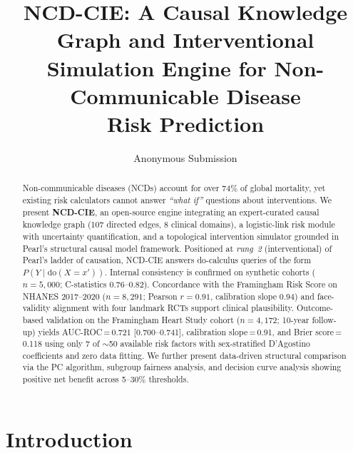 \documentclass[runningheads]{llncs}
\begin{document}
\title{NCD-CIE: A Causal Knowledge Graph and Interventional\\Simulation Engine for Non-Communicable Disease\\Risk Prediction}

\author{Anonymous Submission}

\maketitle

\begin{abstract}
Non-communicable diseases (NCDs) account for over 74\% of global
mortality, yet existing risk calculators cannot answer \emph{``what
if''} questions about interventions.  We present \textbf{NCD-CIE}, an
open-source engine integrating an expert-curated causal knowledge
graph (107 directed edges, 8 clinical domains), a logistic-link risk
module with uncertainty quantification, and a topological intervention
simulator grounded in Pearl's structural causal model framework.
Positioned at \emph{rung~2} (interventional) of Pearl's ladder of
causation, NCD-CIE answers do-calculus queries of the form
$P(Y \mid \mathrm{do}(X\!=\!x'))$.  Internal consistency is confirmed
on synthetic cohorts ($n\!=\!5{,}000$; C-statistics 0.76--0.82).
Concordance with the Framingham Risk Score on NHANES 2017--2020
($n\!=\!8{,}291$; Pearson $r\!=\!0.91$, calibration slope 0.94)
and face-validity alignment with four landmark RCTs support clinical
plausibility.  Outcome-based validation on the Framingham Heart Study
cohort ($n\!=\!4{,}172$; 10-year follow-up) yields AUC-ROC\,=\,0.721
[0.700--0.741], calibration slope\,=\,0.91, and Brier
score\,=\,0.118 using only 7 of ${\sim}$50 available risk factors
with sex-stratified D'Agostino coefficients and zero data fitting.
We further present data-driven structural comparison
via the PC algorithm, subgroup fairness analysis, and decision curve
analysis showing positive net benefit across 5--30\% thresholds.

\end{abstract}

\section{Introduction}\label{sec:intro}
\end{document}
